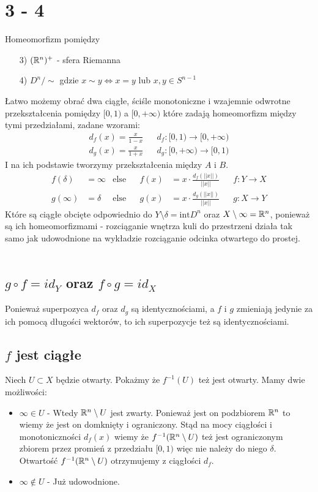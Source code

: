 \newpage
\section*{3 - 4}
Homeomorfizm pomiędzy
\begin{itemize}
  \item[3)] $({\mathbb{R}}^n)^+$ - sfera Riemanna
  \item[4)] $D ^ {n} / \sim $ gdzie $ x \sim y \iff x = y $ lub $ x, y \in S^{n-1} $
\end{itemize}
Łatwo możemy obrać dwa ciągłe, ściśle monotoniczne i wzajemnie odwrotne przekształcenia pomiędzy $[0, 1)$ a $[0, +\infty)$ które zadają homeomorfizm między tymi przedziałami, zadane wzorami:
\begin{align*}
  d_f(x) = \tfrac{x}{1 - x} & & d_f : [0, 1) \to [0, +\infty) \\
  d_g(x) = \tfrac{x}{1 + x} & & d_g : [0, +\infty) \to [0, 1)
\end{align*}
I na ich podstawie tworzymy przekształcenia między $A$ i $B$.
\begin{align*}
  f(\delta) &= \infty & \text{else} & & f(x) &= x \cdot \tfrac{d_f(||x||)}{||x||} & & f : Y \to X \\
  g(\infty) &= \delta & \text{else} & & g(x) &= x \cdot \tfrac{d_g(||x||)}{||x||} & & g : X \to Y
\end{align*}
Które są ciągłe obcięte odpowiednio do $ Y \setminus \delta =  \text{int}{D^n}$ oraz $X \setminus \infty = {\mathbb{R}}^n$, ponieważ są ich homeomorfizmami - rozciąganie wnętrza kuli do przestrzeni działa tak samo jak udowodnione na wykładzie rozciąganie odcinka otwartego do prostej. \\
\\
\subsection*{$g \circ f = id_Y$ oraz $f \circ g = id_X$}
Ponieważ superpozyca $d_f$ oraz $d_g$ są identycznościami, a $f$ i $g$ zmieniają jedynie za ich pomocą długości wektorów, to ich superpozycje też są identycznościami.
\subsection*{$f$ jest ciągłe}
Niech $ U \subset X$ będzie otwarty. Pokażmy że $f^{-1}(U)$ też jest otwarty. Mamy dwie możliwości:
\begin{itemize}
  \item $\infty \in U$ - Wtedy ${\mathbb{R}}^n \setminus U$ jest zwarty. Ponieważ jest on podzbiorem ${\mathbb{R}}^n$ to wiemy że jest on domknięty i ograniczony. Stąd na mocy ciągłości i monotoniczności $d_f(x)$ wiemy że $f^{-1}({\mathbb{R}}^n \setminus U)$ też jest ograniczonym zbiorem przez promień z przedziału $[0,1)$ więc nie należy do niego $\delta$. Otwartość $f^{-1}({\mathbb{R}}^n \setminus U)$ otrzymujemy z ciągłości $d_f$.
  \item $\infty \not \in U$ - Już udowodnione.
\end{itemize}

